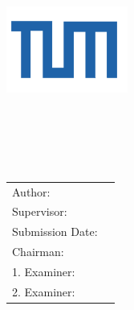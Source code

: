 \begin{titlepage}
\begin{center}
\centering
\vspace{40mm}
\includegraphics[width=40mm]{./includes/logo/tum} \\
\vspace{5mm}
{\huge\MakeUppercase{\getFaculty{}}}\\
\vspace{5mm}
{\large\MakeUppercase{\getUniversity{}}}\\
\vspace{30mm}
{\huge\bfseries \getTitle{}}\\
\end{center}
\vspace{15mm}
\getDoctypeger{} \\
\vspace{15mm}

\begin{center}
\begin{tabular}{l l}
Author: & \getAuthor{} \\
Supervisor: & \getSupervisor{} \\
Submission Date: & \getSubmissionDate{} \\ \hline
Chairman: & \getChairman{} \\
1. Examiner: & \getFirstExaminer{} \\
2. Examiner: & \getSecondExaminer{} \\
\end{tabular}
\end{center}
\end{titlepage}